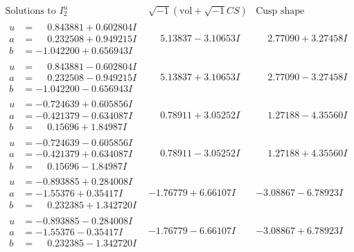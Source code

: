 \documentclass[1p]{elsarticle_modified}
\theoremstyle{definition}
\newcommand{\I}{\sqrt{-1}}
\begin{document}
$$\begin{array}{c|c|c}  
\text{Solutions to }I^u_{2}& \I (\text{vol} + \sqrt{-1}CS) & \text{Cusp shape}\\
 \hline 
\begin{aligned}
u &= \phantom{-}0.843881 + 0.602804 I \\
a &= \phantom{-}0.232508 + 0.949215 I \\
b &= -1.042200 + 0.656943 I\end{aligned}
 & \phantom{-}5.13837 - 3.10653 I & \phantom{-}2.77090 + 3.27458 I \\ \hline\begin{aligned}
u &= \phantom{-}0.843881 - 0.602804 I \\
a &= \phantom{-}0.232508 - 0.949215 I \\
b &= -1.042200 - 0.656943 I\end{aligned}
 & \phantom{-}5.13837 + 3.10653 I & \phantom{-}2.77090 - 3.27458 I \\ \hline\begin{aligned}
u &= -0.724639 + 0.605856 I \\
a &= -0.421379 - 0.634087 I \\
b &= \phantom{-}0.15696 + 1.84987 I\end{aligned}
 & \phantom{-}0.78911 + 3.05252 I & \phantom{-}1.27188 - 4.35560 I \\ \hline\begin{aligned}
u &= -0.724639 - 0.605856 I \\
a &= -0.421379 + 0.634087 I \\
b &= \phantom{-}0.15696 - 1.84987 I\end{aligned}
 & \phantom{-}0.78911 - 3.05252 I & \phantom{-}1.27188 + 4.35560 I \\ \hline\begin{aligned}
u &= -0.893885 + 0.284008 I \\
a &= -1.55376 + 0.35417 I \\
b &= \phantom{-}0.232385 + 1.342720 I\end{aligned}
 & -1.76779 + 6.66107 I & -3.08867 - 6.78923 I \\ \hline\begin{aligned}
u &= -0.893885 - 0.284008 I \\
a &= -1.55376 - 0.35417 I \\
b &= \phantom{-}0.232385 - 1.342720 I\end{aligned}
 & -1.76779 - 6.66107 I & -3.08867 + 6.78923 I \\ \hline\begin{aligned}

\end{aligned}
\end{array}$$
\end{document}

